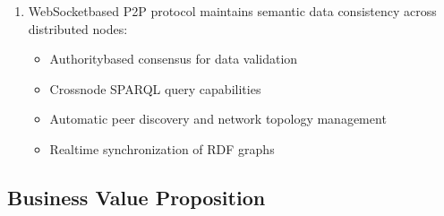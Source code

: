 \documentclass[letterpaper,10pt,english]{sphinxmanual}
\begin{document}
\begin{enumerate}
\sphinxAtStartPar
The system automatically validates all data against a comprehensive traceability ontology that extends PROV\sphinxhyphen{}O:
\begin{itemize}
\item {} 
\sphinxAtStartPar
{}: ProductBatch, IngredientLot, ProcessingActivity

\item {} 
\sphinxAtStartPar
{}: Farmer, Manufacturer, LogisticsProvider, Retailer

\item {} 
\sphinxAtStartPar
{}: EnvironmentalCondition with temperature/humidity

\item {} 
\sphinxAtStartPar
{}: Complete chain of custody tracking

\end{itemize}

\item {} 
\sphinxAtStartPar
{}

\sphinxAtStartPar
WebSocket\sphinxhyphen{}based P2P protocol maintains semantic data consistency across distributed nodes:
\begin{itemize}
\item {} 
\sphinxAtStartPar
Authority\sphinxhyphen{}based consensus for data validation

\item {} 
\sphinxAtStartPar
Cross\sphinxhyphen{}node SPARQL query capabilities

\item {} 
\sphinxAtStartPar
Automatic peer discovery and network topology management

\item {} 
\sphinxAtStartPar
Real\sphinxhyphen{}time synchronization of RDF graphs

\end{itemize}

\end{enumerate}


\subsection{Business Value Proposition}
\label{\detokenize{overview/index:business-value-proposition}}
\end{document}
